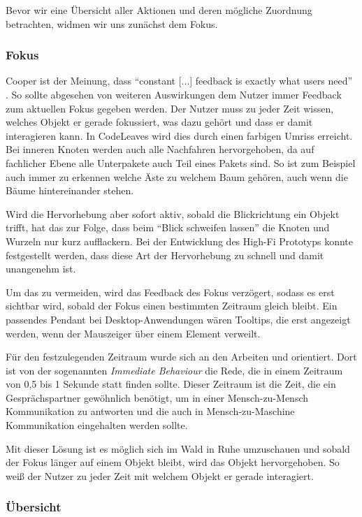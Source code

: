Bevor wir eine Übersicht aller Aktionen und deren mögliche Zuordnung betrachten, widmen wir uns zunächst dem Fokus.

\subsubsection*{Fokus}

Cooper ist  der Meinung, dass ``constant [...] feedback is exactly what users need'' \cite{cooper2014face}. So sollte abgesehen von weiteren Auswirkungen dem Nutzer immer Feedback zum aktuellen Fokus gegeben werden. Der Nutzer muss zu jeder Zeit wissen, welches Objekt er gerade fokussiert, was dazu gehört und dass er damit interagieren kann. In CodeLeaves wird dies durch einen farbigen Umriss erreicht. Bei inneren Knoten werden auch alle Nachfahren hervorgehoben, da auf fachlicher Ebene alle Unterpakete auch Teil eines Pakets sind. So ist zum Beispiel auch immer zu erkennen welche Äste zu welchem Baum gehören, auch wenn die Bäume hintereinander stehen.

Wird die Hervorhebung aber sofort aktiv, sobald die Blickrichtung ein Objekt trifft, hat das zur Folge, dass beim "`Blick schweifen lassen"' die Knoten und Wurzeln nur kurz aufflackern. Bei der Entwicklung des High-Fi Prototyps konnte festgestellt werden, dass diese Art der Hervorhebung zu schnell und damit unangenehm ist.

Um das zu vermeiden, wird das Feedback des Fokus verzögert, sodass es erst sichtbar wird, sobald der Fokus einen bestimmten Zeitraum gleich bleibt. Ein passendes Pendant bei Desktop-Anwendungen wären Tooltips, die erst angezeigt werden, wenn der Mauszeiger über einem Element verweilt.

Für den festzulegenden Zeitraum wurde sich an den Arbeiten \cite{miller1956magical} und \cite{mishunov2015why} orientiert. Dort ist von der sogenannten \textit{Immediate Behaviour} die Rede, die in einem Zeitraum von 0,5 bis 1 Sekunde statt finden sollte. Dieser Zeitraum ist die Zeit, die ein Gesprächspartner gewöhnlich benötigt, um in einer Mensch-zu-Mensch Kommunikation zu antworten und die auch in Mensch-zu-Maschine Kommunikation eingehalten werden sollte.

Mit dieser Lösung ist es möglich sich im Wald in Ruhe umzuschauen und sobald der Fokus länger auf einem Objekt bleibt, wird das Objekt hervorgehoben. So weiß der Nutzer zu jeder Zeit mit welchem Objekt er gerade interagiert.

\subsubsection*{Übersicht}


